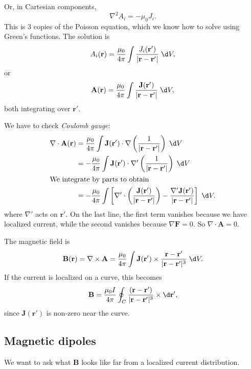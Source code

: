 \documentclass[a4paper]{article}
\begin{document}
Or, in Cartesian components,
\[
  \nabla^2 A_i = -\mu_0 J_i.
\]
This is 3 copies of the Poisson equation, which we know how to solve using Green's functions. The solution is
\[
  A_i (\mathbf{r}) = \frac{\mu_0}{4\pi}\int \frac{J_i (\mathbf{r}')}{|\mathbf{r} - \mathbf{r}'|}\;\d V,
\]
or
\[
  \mathbf{A}(\mathbf{r}) = \frac{\mu_0}{4\pi}\int \frac{\mathbf{J}(\mathbf{r'})}{|\mathbf{r} - \mathbf{r}'|}\;\d V,
\]
both integrating over $\mathbf{r}'$.

We have to check \emph{Coulomb gauge}:
\begin{align*}
  \nabla\cdot \mathbf{A}(\mathbf{r}) &= \frac{\mu_0}{4\pi}\int \mathbf{J}(\mathbf{r}')\cdot \nabla\left(\frac{1}{|\mathbf{r} - \mathbf{r}'|}\right)\;\d V\\
  &= -\frac{\mu_0}{4\pi}\int \mathbf{J}(\mathbf{r}') \cdot \nabla'\left(\frac{1}{|\mathbf{r} - \mathbf{r}'|}\right)\;\d V\\
  \intertext{We integrate by parts to obtain}
  &= -\frac{\mu_0}{4\pi}\int \left[\nabla'\cdot \left(\frac{\mathbf{J}(\mathbf{r}')}{|\mathbf{r} - \mathbf{r}'|}\right) - \frac{\nabla' \mathbf{J}(\mathbf{r}')}{|\mathbf{r} - \mathbf{r}'|}\right]\;\d V.
\end{align*}
where $\nabla'$ acts on $\mathbf{r}'$. On the last line, the first term vanishes because we have localized current, while the second vanishes because $\nabla \mathbf{F} = 0$. So $\nabla\cdot \mathbf{A} = 0$.

\begin{law}
  The magnetic field is
  \[
    \mathbf{B}(\mathbf{r}) = \nabla \times \mathbf{A} = \frac{\mu_0}{4\pi}\int \mathbf{J}(\mathbf{r}')\times \frac{\mathbf{r} - \mathbf{r}'}{|\mathbf{r} - \mathbf{r}'|^3}\;\d V.
  \]
  If the current is localized on a curve, this becomes
  \[
    \mathbf{B} = \frac{\mu_0 I}{4\pi}\oint_C \frac{(\mathbf{r} - \mathbf{r}')}{|\mathbf{r} - \mathbf{r}'|^3}\times \d \mathbf{r}',
  \]
  since $\mathbf{J}(\mathbf{r}')$ is non-zero near the curve.
\end{law}

\subsection{Magnetic dipoles}
We want to ask what $\mathbf{B}$ looks like far from a localized current distribution.
\end{document}
